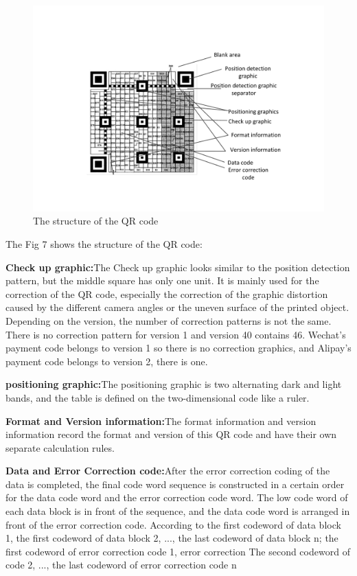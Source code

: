 \documentclass[journal]{IEEEtran}
\begin{document}
\begin{figure}[htbp]
\centerline{\includegraphics[scale=0.46]{QRcode.pdf}}
\caption{The structure of the QR code}
\label{fig}
\end{figure}

The Fig 7 shows the structure of the QR code:

\textbf{Check up graphic:}The Check up graphic looks similar to the position detection pattern, but the middle square has only one unit. It is mainly used for the correction of the QR code, especially the correction of the graphic distortion caused by the different camera angles or the uneven surface of the printed object. Depending on the version, the number of correction patterns is not the same. There is no correction pattern for version 1 and version 40 contains 46. Wechat's payment code belongs to version 1 so there is no correction graphics, and Alipay's payment code belongs to version 2, there is one.

\textbf{positioning graphic:}The positioning graphic is two alternating dark and light bands, and the table is defined on the two-dimensional code like a ruler.

\textbf{Format and Version information:}The format information and version information record the format and version of this QR code and have their own separate calculation rules.

\textbf{Data and Error Correction code:}After the error correction coding of the data is completed, the final code word sequence is constructed in a certain order for the data code word and the error correction code word. The low code word of each data block is in front of the sequence, and the data code word is arranged in front of the error correction code. According to the first codeword of data block 1, the first codeword of data block 2, ..., the last codeword of data block n; the first codeword of error correction code 1, error correction The second codeword of code 2, ..., the last codeword of error correction code n
\end{document}
